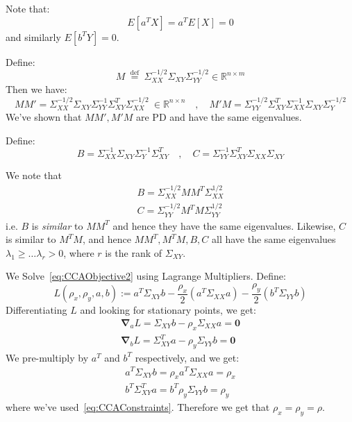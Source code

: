 \documentclass{article}
\begin{document}
Note that:
\[
  E[a^{T} X] = a^{T} E[X] = 0
\]
and similarly $E[b^{T} Y] = 0$. 

Define:
\[
  M \stackrel{\text{ def }}{=}  \Sigma_{XX}^{-1/2} \Sigma_{XY} \Sigma_{YY}^{-1/2} \in \mathbb{R}^{n \times  m}  
\]
Then we have:
\[
  MM' = \Sigma_{XX}^{-1/2} \Sigma_{XY} \Sigma_{YY} ^{-1} \Sigma_{XY}^{T} \Sigma_{XX}^{-1/2} \ \in \mathbb{R}^{n \times n} \quad, \quad  M'M   = \Sigma_{YY}^{-1/2} \Sigma_{XY}^{T} \Sigma_{XX} ^{-1} \Sigma_{XY} \Sigma_{Y}^{-1/2}
\]
We've shown that $MM', M'M$ are PD and have the same eigenvalues. 

Define:
\[
  B = \Sigma_{XX} ^{-1} \Sigma_{XY} \Sigma_{Y}^{-1} \Sigma_{XY}^{T} \quad, \quad  C = \Sigma_{YY} ^{-1}  \Sigma_{XY}^{T} \Sigma_{XX} \Sigma_{XY}
\]

We note that
\begin{gather}
  B = \Sigma_{XX}^{-1/2} MM^{T} \Sigma_{XX}^{1/2} \label{eq:CCABasMMT} \\
  C = \Sigma_{YY}^{-1/2} M^{T} M \Sigma_{YY}^{1/2} \label{eq:CCACasMTM}
\end{gather}
i.e. $B$ is \textit{similar} to $MM^{T}$ and hence they have the same eigenvalues. Likewise, $C$ is similar to $M^{T}M$, and hence $MM^{T}, M^{T}M,B,C$ all have the same eigenvalues $\lambda_1 \geq \ldots \lambda_{r} > 0$, where $r$ is the rank of $\Sigma_{XY}$.  


We Solve~\cref{eq:CCAObjective2} using Lagrange Multipliers. Define:
\[
  L(\rho_{x}, \rho_{y}, a,b) := a^{T} \Sigma_{XY} b - \frac{\rho_{x}}{2} ( a^{T} \Sigma_{XX} a)  - \frac{\rho_{y}}{2} (b^{T} \Sigma_{YY} b)
\]
Differentiating $L$ and looking for stationary points, we get:
\begin{gather}
  \bm{\nabla}_{a} L = \Sigma_{XY} b - \rho_{x} \Sigma_{XX} a = \bm{0} \label{eq:CCADer1} \\
  \bm{\nabla}_{b} L = \Sigma_{XY}^{T} a - \rho_{y} \Sigma_{YY} b = \bm{0} \label{eq:CCADer2}
\end{gather}
We pre-multiply by $a^{T}$ and $b^{T}$ respectively, and we get:
\begin{gather}
  a^{T}\Sigma_{XY} b = \rho_{x} a^{T} \Sigma_{XX} a = \rho_{x} \label{eq:CCADer3}  \\
  b^{T} \Sigma_{XY}^{T} a = b^{T} \rho_{y} \Sigma_{YY} b  = \rho_{y} \label{eq:CCADer4}
\end{gather}
where we've used~\cref{eq:CCAConstraints}. Therefore we get that $\rho_{x}=\rho_{y}=\rho$. 
\end{document}
